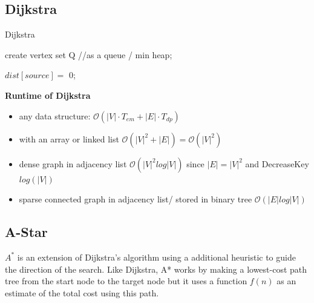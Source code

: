 \documentclass[10pt,landscape,a4paper, table]{extarticle}
\begin{document}
\begin{multicols*}{3}
\subsection{Dijkstra}

{\scriptsize
\begin{algorithm}[H]
    \caption{Dijkstra}
    \label{FWAlgorithm}
    \SetAlgoLined
    create vertex set Q //as a queue / min heap;
    
    $dist[source] =$ 0;
    

\end{algorithm}}
\textbf{Runtime of Dijkstra}
\begin{itemize}
    \item any data structure: $\mathcal{O}(|V|\cdot T_{em} + |E| \cdot T_{dp})$
    \item with an array or linked list $\mathcal{O}(|V|^2 + |E|) = \mathcal{O}(|V|^2) $
    \item dense graph in adjacency list $\mathcal{O}(|V|^2 log |V|) $ since $|E| = |V|^2$ and DecreaseKey $log(|V|)$
    \item sparse connected graph in adjacency list/ stored in binary tree $\mathcal{O}(|E|  log |V|) $
\end{itemize}

\subsection{A-Star}

$A^*$ is an extension of Dijkstra's algorithm using a additional heuristic to guide the direction of the search. Like Dijkstra, A* works by making a lowest-cost path tree from the start node to the target node but it uses a function $f(n)$ as an estimate of the total cost using this path. 


\end{multicols*}
\end{document}
